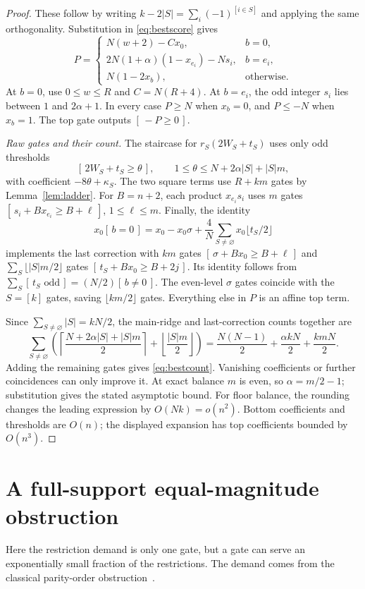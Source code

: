 \documentclass[11pt]{article}
\newcommand{\ind}[1]{[\,#1\,]}
\begin{document}
\begin{proof}
These follow by writing $k-2|S|=\sum_i(-1)^{[i\in S]}$ and applying the
same orthogonality. Substitution in \eqref{eq:bestscore} gives
\begin{equation}\label{eq:bestclosed}
P=\begin{cases}
N(w+2)-Cx_0,&b=0,\\
2N(1+\alpha)(1-x_{e_i})-Ns_i,&b=e_i,\\
N(1-2x_b),&\text{otherwise}.
\end{cases}
\end{equation}
At $b=0$, use $0\le w\le R$ and $C=N(R+4)$. At $b=e_i$, the odd
integer $s_i$ lies between $1$ and $2\alpha+1$. In every case $P\ge N$
when $x_b=0$, and $P\le-N$ when $x_b=1$. The top gate outputs $\ind{-P\ge0}$.

\emph{Raw gates and their count.}
The staircase for $r_S(2W_S+t_S)$ uses only odd thresholds
$$
\ind{2W_S+t_S\ge\theta},\qquad
1\le\theta\le N+2\alpha|S|+|S|m,
$$
with coefficient $-8\theta+\kappa_S$. The two square terms use $R+km$
gates by Lemma~\ref{lem:ladder}. For $B=n+2$, each product $x_{e_i}s_i$
uses $m$ gates $\ind{s_i+Bx_{e_i}\ge B+\ell}$, $1\le\ell\le m$.
Finally, the identity
$$
x_0\ind{b=0}=x_0-x_0\sigma+
 \frac4N\sum_{S\ne\varnothing}x_0\lfloor t_S/2\rfloor
$$
implements the last correction with $km$ gates
$\ind{\sigma+Bx_0\ge B+\ell}$ and
$\sum_S\lfloor |S|m/2\rfloor$ gates
$\ind{t_S+Bx_0\ge B+2j}$. Its identity follows from
$\sum_S\ind{t_S\text{ odd}}=(N/2)\ind{b\ne0}$.
The even-level $\sigma$ gates coincide with the $S=[k]$ gates, saving
$\lfloor km/2\rfloor$ gates. Everything else in $P$ is an affine top term.

Since $\sum_{S\ne\varnothing}|S|=kN/2$, the main-ridge and last-correction
counts together are
$$
\sum_{S\ne\varnothing}\left(
 \left\lceil\frac{N+2\alpha|S|+|S|m}{2}\right\rceil
 +\left\lfloor\frac{|S|m}{2}\right\rfloor\right)
 =\frac{N(N-1)}2+\frac{\alpha kN}2+\frac{kmN}2.
$$
Adding the remaining gates gives \eqref{eq:bestcount}. Vanishing coefficients
or further coincidences can only improve it. At exact balance $m$ is even,
so $\alpha=m/2-1$; substitution gives the stated asymptotic bound.
For floor balance, the rounding changes the leading expression by
$O(Nk)=o(n^2)$. Bottom coefficients and thresholds are $O(n)$; the displayed
expansion has top coefficients bounded by $O(n^3)$.
\end{proof}



\section{A full-support equal-magnitude obstruction}\label{sec:fullsign}
Here the restriction demand is only one gate, but a gate can serve an
exponentially small fraction of the restrictions. The demand comes from
the classical parity-order obstruction~\cite[Section~3.1]{MP}.
\end{document}
